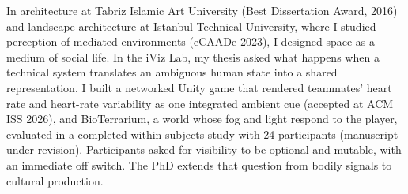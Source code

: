 \documentclass[letterpaper,11pt]{article}
\begin{document}
In architecture at Tabriz Islamic
Art University (Best Dissertation Award, 2016) and landscape architecture at
Istanbul Technical University, where I studied perception of mediated
environments (eCAADe 2023), I designed space as a medium of social life. In the
iViz Lab, my thesis asked what happens when a technical system translates an
ambiguous human state into a shared representation. I built a networked Unity
game that rendered teammates' heart rate and heart-rate variability as one
integrated ambient cue (accepted at ACM ISS 2026), and BioTerrarium, a world
whose fog and light respond to the player, evaluated in a completed
within-subjects study with 24 participants (manuscript under revision). Participants asked for visibility to be
optional and mutable, with an immediate off switch. The PhD extends that
question from bodily signals to cultural production.
\end{document}
